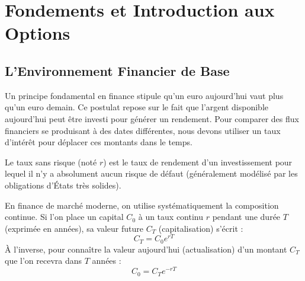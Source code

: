 \section{Fondements et Introduction aux Options}

\subsection{L'Environnement Financier de Base}

Un principe fondamental en finance stipule qu'un euro aujourd'hui vaut plus qu'un euro demain. Ce postulat repose sur le fait que l'argent disponible aujourd'hui peut être investi pour générer un rendement. Pour comparer des flux financiers se produisant à des dates différentes, nous devons utiliser un taux d'intérêt pour déplacer ces montants dans le temps.

\begin{definitionbox}
Le taux sans risque (noté $r$) est le taux de rendement d'un investissement pour lequel il n'y a absolument aucun risque de défaut (généralement modélisé par les obligations d'États très solides). 
\end{definitionbox}

En finance de marché moderne, on utilise systématiquement la composition continue. Si l'on place un capital $C_0$ à un taux continu $r$ pendant une durée $T$ (exprimée en années), sa valeur future $C_T$ (capitalisation) s'écrit :
\begin{equation}
    \label{eq:fsec1-capitalisation}
    C_T = C_0 e^{rT}
\end{equation}
À l'inverse, pour connaître la valeur aujourd'hui (actualisation) d'un montant $C_T$ que l'on recevra dans $T$ années :
\begin{equation}
    \label{eq:fsec1-actualisation}
    C_0 = C_T e^{-rT}
\end{equation}

\vspace{0.5cm}
\begin{center}
\end{center}
\vspace{0.5cm}

